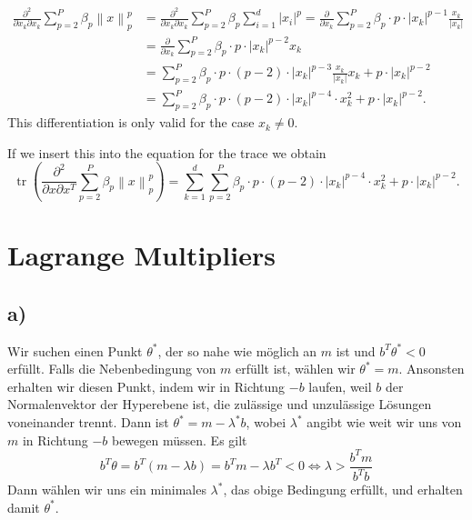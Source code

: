 \documentclass[paper=a4,fontsize=10pt,DIV11,BCOR10mm]{scrartcl}
\newcommand{\norm}[1]{\left\lVert#1\right\rVert}
\DeclareMathOperator{\tr}{tr}
\begin{document}
\begin{align*}
\frac{\partial^2}{\partial x_k\partial x_k} \sum_{p=2}^P \beta_p \norm{x}_p^p &=\frac{\partial^2}{\partial x_k\partial x_k}\sum_{p=2}^P \beta_p \sum_{i=1}^d \lvert x_i \rvert^p =\frac{\partial}{\partial x_k}\sum_{p=2}^P \beta_p \cdot p \cdot \lvert x_k\rvert^{p-1} \frac{x_k}{\lvert x_k\rvert}\\
&=\frac{\partial}{\partial x_k}\sum_{p=2}^P \beta_p \cdot  p \cdot \lvert x_k\rvert^{p-2} x_k \\
&=\sum_{p=2}^P \beta_p \cdot  p \cdot (p-2) \cdot \lvert x_k\rvert^{p-3}\frac{x_k}{\lvert x_k\rvert}  x_k +p \cdot \lvert x_k\rvert^{p-2}\\
&=\sum_{p=2}^P \beta_p \cdot  p \cdot (p-2) \cdot \lvert x_k\rvert^{p-4}\cdot x_k^2 +p \cdot \lvert x_k\rvert^{p-2}\text{.}
\end{align*}
This differentiation is only valid for the case $x_k \neq 0$.

If we insert this into the equation for the trace we obtain
\begin{equation*}
\tr(\frac{\partial^2}{\partial x\partial x^T} \sum_{p=2}^P \beta_p \norm{x}_p^p )=\sum_{k=1}^d\sum_{p=2}^P \beta_p \cdot p \cdot (p-2) \cdot \lvert x_k\rvert^{p-4}\cdot x_k^2 +p \cdot \lvert x_k\rvert^{p-2}\text{.}
\end{equation*}


\section{Lagrange Multipliers}

\subsection*{a)}

Wir suchen einen Punkt $\theta^*$, der so nahe wie möglich an $m$ ist und $b^T \theta^* < 0$ erfüllt. Falls die Nebenbedingung von $m$ erfüllt ist, wählen wir $\theta^* = m$. Ansonsten erhalten wir diesen Punkt, indem wir in Richtung $-b$ laufen, weil $b$ der Normalenvektor der Hyperebene ist, die zulässige und unzulässige Lösungen voneinander trennt. Dann ist $\theta^* = m - \lambda^* b$, wobei $\lambda^*$ angibt wie weit wir uns von $m$ in Richtung $-b$ bewegen müssen. Es gilt
\[ b^T \theta = b^T (m - \lambda b) = b^T m - \lambda b^T < 0 \Leftrightarrow \lambda > \frac{b^T m}{b^T b} \]
Dann wählen wir uns ein minimales $\lambda^*$, das obige Bedingung erfüllt, und erhalten damit $\theta^*$.
\end{document}
